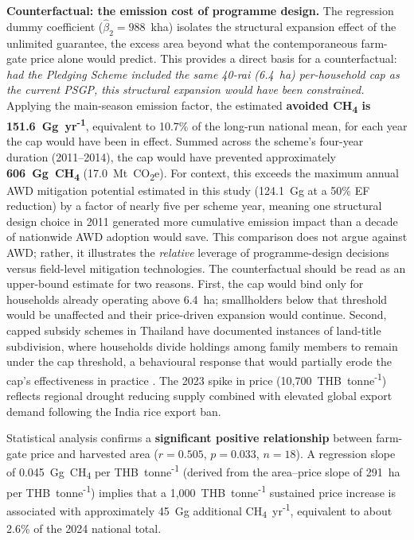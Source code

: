 \documentclass[fleqn,10pt]{olplainarticle}
\begin{document}
\textbf{Counterfactual: the emission cost of programme design.}
The regression dummy coefficient ($\hat{\beta}_2 = 988$~kha) isolates the
structural expansion effect of the unlimited guarantee, the excess area beyond
what the contemporaneous farm-gate price alone would predict.
This provides a direct basis for a counterfactual: \textit{had the Pledging
Scheme included the same 40-rai (6.4~ha) per-household cap as the current PSGP,
this structural expansion would have been constrained.}
Applying the main-season emission factor, the estimated \textbf{avoided
CH\textsubscript{4} is 151.6~Gg~yr\textsuperscript{-1}}, equivalent to 10.7\%
of the long-run national mean, for each year the cap would have been in effect.
Summed across the scheme's four-year duration (2011--2014), the cap would have
prevented approximately \textbf{606~Gg~CH\textsubscript{4}} (17.0~Mt~CO\textsubscript{2}e).
For context, this exceeds the maximum annual AWD mitigation potential estimated
in this study (124.1~Gg at a 50\% EF reduction) by a factor of nearly five per
scheme year, meaning one structural design choice in 2011 generated more
cumulative emission impact than a decade of nationwide AWD adoption would save.
This comparison does not argue against AWD; rather, it illustrates the
\textit{relative} leverage of programme-design decisions versus field-level
mitigation technologies.
The counterfactual should be read as an upper-bound estimate for two reasons.
First, the cap would bind only for households already operating above 6.4~ha;
smallholders below that threshold would be unaffected and their price-driven
expansion would continue.
Second, capped subsidy schemes in Thailand have documented instances of
land-title subdivision, where households divide holdings among family members
to remain under the cap threshold, a behavioural response that would partially
erode the cap's effectiveness in practice \citep{poapongsakorn2014}.
The 2023 spike in price (10,700~THB~tonne\textsuperscript{-1}) reflects
regional drought reducing supply combined with elevated
global export demand following the India rice export ban.

Statistical analysis confirms a \textbf{significant positive relationship}
between farm-gate price and harvested area ($r = 0.505$, $p = 0.033$, $n = 18$).
A regression slope of 0.045~Gg~CH\textsubscript{4} per THB~tonne\textsuperscript{-1}
(derived from the area--price slope of 291~ha per THB~tonne\textsuperscript{-1})
implies that a 1,000~THB~tonne\textsuperscript{-1} sustained price increase
is associated with approximately 45~Gg additional CH\textsubscript{4}~yr\textsuperscript{-1},
equivalent to about 2.6\% of the 2024 national total.
\end{document}

